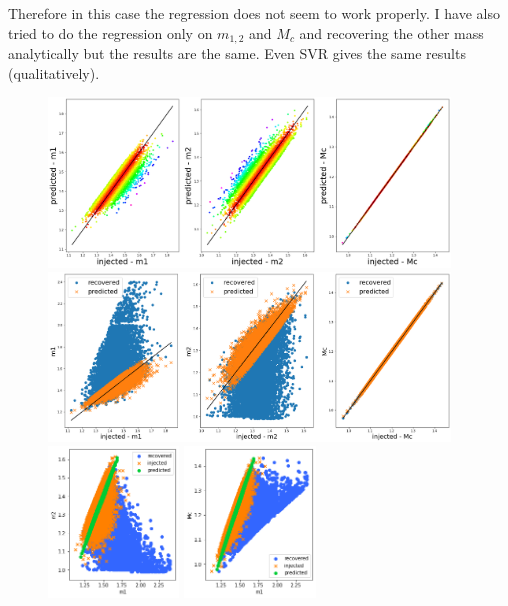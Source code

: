 \documentclass[prd,aps,twocolumn,a4paper,showkeys,nofootinbib]{revtex4-1}
\begin{document}
Therefore in this case the regression does not seem to work properly. I have also tried to 
do the regression only on $m_{1,2}$ and $M_c$ and recovering the other mass analytically 
but the results are the same. Even SVR gives the same results (qualitatively).
%
\begin{figure}[t]
  \center
  \includegraphics[width=0.95\textwidth]{./Figs/GstLAL_regression.png}
  \includegraphics[width=0.95\textwidth]{./Figs/GstLAL_regression_noise.png}
  \includegraphics[width=0.31\textwidth]{./Figs/GstLAL_m2.png}
  \includegraphics[width=0.31\textwidth]{./Figs/GstLAL_Mc.png}

\end{figure}
\end{document}
